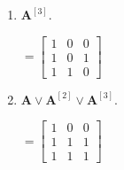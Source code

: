 \documentclass[11pt]{article}
\begin{document}
\begin{enumerate}[label=\textbf{\arabic*.}]
\begin{enumerate}[label=\textbf{\alph*)}]
		\item $\textbf{A}^{[3]}$.
		
		$=
		\begin{bmatrix}
			1 & 0 & 0 \\
			1 & 0 & 1 \\
			1 & 1 & 0
		\end{bmatrix}$
	
		\item $\textbf{A} \lor \textbf{A}^{[2]} \lor \textbf{A}^{[3]}$.
		
		$=
		\begin{bmatrix}
			1 & 0 & 0 \\
			1 & 1 & 1 \\
			1 & 1 & 1
		\end{bmatrix}$
	\end{enumerate}
\end{enumerate}
\end{document}
